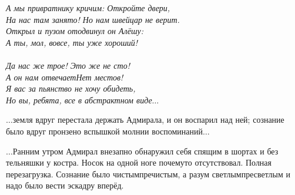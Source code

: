 \vspace{0.5cm}
\noindent\textit{%
	\hspace*{1.7cm}А мы привратнику кричим: Откройте двери, \\
	\hspace*{1.7cm}На нас там занято! Но нам швейцар не верит. \\
	\hspace*{1.7cm}Открыл и пузом отодвинул он Алёшу: \\
	\hspace*{1.7cm}\diagdash А ты, мол, вовсе, ты уже хороший!\\
	\\
	\hspace*{1.7cm}\diagdash Да нас же трое! Это же не сто!\\
	\hspace*{1.7cm}А он нам отвечает\mdash Нет местов!\\
	\hspace*{1.7cm}Я вас за пьянство не хочу обидеть,\\
	\hspace*{1.7cm}Но вы, ребята, все в абстрактном виде$\ldots$ 
}
\vspace{0.5cm}

$\ldots$земля вдруг перестала держать Адмирала, и он воспарил над ней; сознание было вдруг пронзено вспышкой молнии воспоминаний$\ldots$





$\ldots$Ранним утром Адмирал внезапно обнаружил себя спящим в шортах и без тельняшки у костра. Носок на одной ноге почему\sdash то отсутствовал. Полная перезагрузка. Сознание было чистым\sdash пречистым, а разум светлым\sdash пресветлым и надо было вести эскадру вперёд.

\begin{center}
\end{center}
